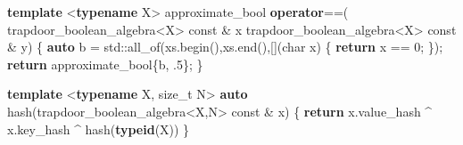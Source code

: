 \documentclass[
]{article}
\newenvironment{Shaded}{\begin{snugshade}}{\end{snugshade}}
\newcommand{\AttributeTok}[1]{\textcolor[rgb]{0.77,0.63,0.00}{#1}}
\newcommand{\BuiltInTok}[1]{#1}
\newcommand{\ControlFlowTok}[1]{\textcolor[rgb]{0.13,0.29,0.53}{\textbf{#1}}}
\newcommand{\DataTypeTok}[1]{\textcolor[rgb]{0.13,0.29,0.53}{#1}}
\newcommand{\DecValTok}[1]{\textcolor[rgb]{0.00,0.00,0.81}{#1}}
\newcommand{\FloatTok}[1]{\textcolor[rgb]{0.00,0.00,0.81}{#1}}
\newcommand{\KeywordTok}[1]{\textcolor[rgb]{0.13,0.29,0.53}{\textbf{#1}}}
\newcommand{\NormalTok}[1]{#1}
\begin{document}
\begin{Shaded}
\begin{Highlighting}[]
\KeywordTok{template}\NormalTok{ \textless{}}\KeywordTok{typename}\NormalTok{ X\textgreater{}}
\NormalTok{approximate\_bool }\KeywordTok{operator}\NormalTok{==(}
\NormalTok{    trapdoor\_boolean\_algebra\textless{}X\textgreater{} }\AttributeTok{const}\NormalTok{ \& x}
\NormalTok{    trapdoor\_boolean\_algebra\textless{}X\textgreater{} }\AttributeTok{const}\NormalTok{ \& y)}
\NormalTok{\{}
    \KeywordTok{auto}\NormalTok{ b = }\BuiltInTok{std::}\NormalTok{all\_of(xs.begin(),xs.end(),[](}\DataTypeTok{char}\NormalTok{ x) \{ }\ControlFlowTok{return}\NormalTok{ x == }\DecValTok{0}\NormalTok{; \});}
    \ControlFlowTok{return}\NormalTok{ approximate\_bool\{b, }\FloatTok{.5}\NormalTok{\};}
\NormalTok{\}}


\KeywordTok{template}\NormalTok{ \textless{}}\KeywordTok{typename}\NormalTok{ X, }\DataTypeTok{size\_t}\NormalTok{ N\textgreater{}}
\KeywordTok{auto}\NormalTok{ hash(trapdoor\_boolean\_algebra\textless{}X,N\textgreater{} }\AttributeTok{const}\NormalTok{ \& x)}
\NormalTok{\{}
    \ControlFlowTok{return}\NormalTok{ x.value\_hash \^{} x.key\_hash \^{} hash(}\KeywordTok{typeid}\NormalTok{(X))}
\NormalTok{\}}
\end{Highlighting}
\end{Shaded}
\end{document}
